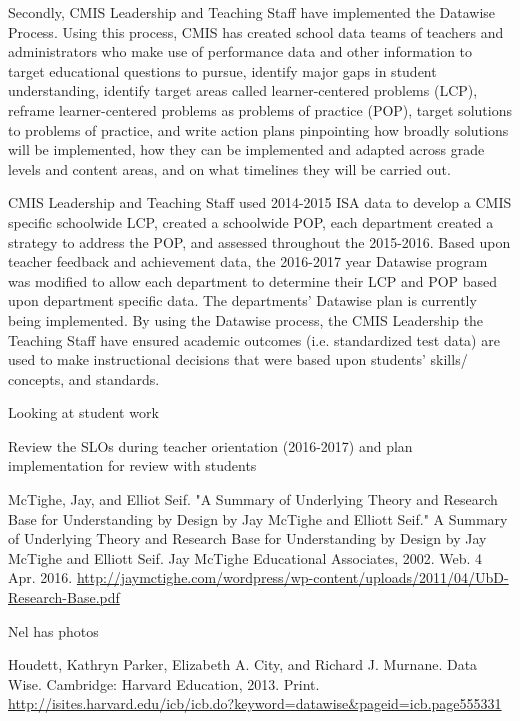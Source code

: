 \documentclass{report}
\begin{document}
\begin{findings}

Secondly, CMIS Leadership and Teaching Staff have implemented the Datawise Process. Using this process, CMIS has created school data teams of teachers and administrators who make use of performance data and other information to target educational questions to pursue, identify major gaps in student understanding, identify target areas called learner-centered problems (LCP), reframe learner-centered problems as problems of practice (POP), target solutions to problems of practice, and write action plans pinpointing how broadly solutions will be implemented, how they can be implemented and adapted across grade levels and content areas, and on what timelines they will be carried out. 

CMIS Leadership and Teaching Staff used 2014-2015 ISA data to develop a CMIS specific schoolwide LCP, created a schoolwide POP, each department created a strategy to address the POP, and assessed throughout the 2015-2016. Based upon teacher feedback and achievement data, the 2016-2017 year Datawise program was modified to allow each department to determine their LCP and POP based upon department specific data. The departments’ Datawise plan is currently being implemented. By using the Datawise process, the CMIS Leadership the Teaching Staff have ensured academic outcomes (i.e. standardized test data) are used to make instructional decisions that were based upon students’ skills/ concepts, and standards. 

Looking at student work

Review the SLOs during teacher orientation (2016-2017) and plan implementation for review with students 
\end{findings}

\begin{evidence}
\item McTighe, Jay, and Elliot Seif. "A Summary of Underlying Theory and Research Base for Understanding by Design by Jay McTighe and Elliott Seif." A Summary of Underlying Theory and Research Base for Understanding by Design by Jay McTighe and Elliott Seif. Jay McTighe Educational Associates, 2002. Web. 4 Apr. 2016. \url{http://jaymctighe.com/wordpress/wp-content/uploads/2011/04/UbD-Research-Base.pdf}
\item Nel has photos
\item Houdett, Kathryn Parker, Elizabeth A. City, and Richard J. Murnane. Data Wise. Cambridge: Harvard Education, 2013. Print. \url{http://isites.harvard.edu/icb/icb.do?keyword=datawise&pageid=icb.page555331}
\end{evidence}
\end{document}
